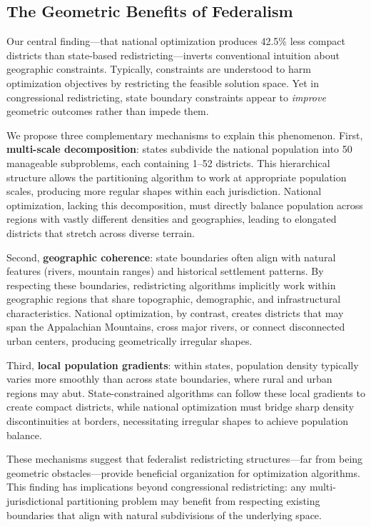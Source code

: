 
\subsection{The Geometric Benefits of Federalism}

Our central finding---that national optimization produces 42.5\% less compact districts than state-based redistricting---inverts conventional intuition about geographic constraints. Typically, constraints are understood to harm optimization objectives by restricting the feasible solution space. Yet in congressional redistricting, state boundary constraints appear to \textit{improve} geometric outcomes rather than impede them.

We propose three complementary mechanisms to explain this phenomenon. First, \textbf{multi-scale decomposition}: states subdivide the national population into 50 manageable subproblems, each containing 1--52 districts. This hierarchical structure allows the partitioning algorithm to work at appropriate population scales, producing more regular shapes within each jurisdiction. National optimization, lacking this decomposition, must directly balance population across regions with vastly different densities and geographies, leading to elongated districts that stretch across diverse terrain.

Second, \textbf{geographic coherence}: state boundaries often align with natural features (rivers, mountain ranges) and historical settlement patterns. By respecting these boundaries, redistricting algorithms implicitly work within geographic regions that share topographic, demographic, and infrastructural characteristics. National optimization, by contrast, creates districts that may span the Appalachian Mountains, cross major rivers, or connect disconnected urban centers, producing geometrically irregular shapes.

Third, \textbf{local population gradients}: within states, population density typically varies more smoothly than across state boundaries, where rural and urban regions may abut. State-constrained algorithms can follow these local gradients to create compact districts, while national optimization must bridge sharp density discontinuities at borders, necessitating irregular shapes to achieve population balance.

These mechanisms suggest that federalist redistricting structures---far from being geometric obstacles---provide beneficial organization for optimization algorithms. This finding has implications beyond congressional redistricting: any multi-jurisdictional partitioning problem may benefit from respecting existing boundaries that align with natural subdivisions of the underlying space.

